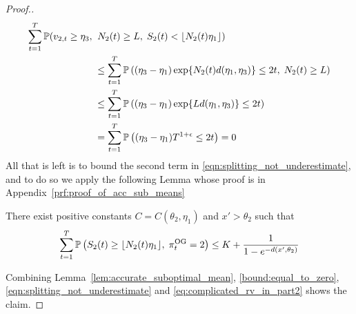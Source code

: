\begin{proof}[Proof.]
\begin{align}
	\sum_{t=1}^T \mathbb{P}(v_{2,t} \ge \eta_3 ,\; & \; N_2(t) \ge L,\; S_2(t) < \lfloor N_2(t) \eta_1\rfloor) \nonumber \\
	& \le  \sum_{t=1}^T\mathbb{P} \left(   (\eta_3-\eta_1) \exp\{N_2(t) d(\eta_1,\eta_3) \} \le 2t,\; N_2(t) \ge L \right) \nonumber \\
	& \le  \sum_{t=1}^T\mathbb{P} \left(   (\eta_3-\eta_1) \exp\{L d(\eta_1,\eta_3) \} \le 2t \right) \nonumber \\
	& =   \sum_{t=1}^T\mathbb{P} \left(   (\eta_3-\eta_1) T^{1+\epsilon} \le 2t \right) = 0 \label{bound:equal_to_zero}
	\end{align}
	All that is left is to bound the second term in \eqref{eqn:splitting_not_underestimate}, and to do so we apply the following Lemma whose proof is in Appendix~\ref{prf:proof_of_acc_sub_means}
	\begin{lemma} \label{lem:accurate_suboptimal_mean}
		There exist positive constants $C = C(\theta_2,\eta_1)$ and $x' > \theta_2$ such that
		\begin{equation*}
		\sum_{t=1}^T \mathbb{P} \left( S_2(t) \ge \lfloor N_2(t) \eta_1\rfloor, \; \pi^{\rm OG}_t = 2 \right) \le  K + \frac{1}{1 - e^{-d(x',\theta_2)}} 
		\end{equation*}
	\end{lemma}
	Combining Lemma~\ref{lem:accurate_suboptimal_mean}, \eqref{bound:equal_to_zero}, \eqref{eqn:splitting_not_underestimate} and \eqref{eq:complicated_rv_in_part2} shows the claim.
\end{proof}

